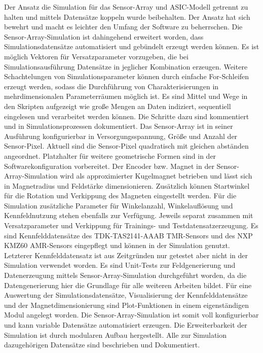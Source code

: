 \newline
Der Ansatz die Simulation für das Sensor-Array und ASIC-Modell getrennt zu halten und mittels Datensätze koppeln wurde beibehalten. Der Ansatz hat sich bewehrt und macht es leichter den Umfang der Software zu beherrschen. Die Sensor-Array-Simulation ist dahingehend erweitert worden, dass Simulationsdatensätze automatisiert und gebündelt erzeugt werden können. Es ist möglich Vektoren für Versatzparameter vorzugeben, die bei Simulationsausführung Datensätze in jeglicher Kombination erzeugen. Weitere Schachtelungen von Simulationsparameter können durch einfache For-Schleifen erzeugt werden, sodass die Durchführung von Charakterisierungen in mehrdimensionalen Parameterräumen möglich ist. Es sind Mittel und Wege in den Skripten aufgezeigt wie große Mengen an Daten indiziert, sequentiell eingelesen und verarbeitet werden können. Die Schritte dazu sind kommentiert und in Simulationsprozessen dokumentiert. Das Sensor-Array ist in seiner Ausführung konfigurierbar in Versorgungsspannung, Größe und Anzahl der Sensor-Pixel. Aktuell sind die Sensor-Pixel quadratisch mit gleichen abständen angeordnet. Platzhalter für weitere geometrische Formen sind in der Softwarekonfiguration vorbereitet. Der Encoder bzw. Magnet in der Sensor-Array-Simulation wird als approximierter Kugelmagnet betrieben und lässt sich in Magnetradius und Feldstärke dimensionieren. Zusätzlich können Startwinkel für die Rotation und Verkippung des Magneten eingestellt werden. Für die Simulation zusätzliche Parameter für Winkelanzahl, Winkelauflösung und Kennfeldnutzung stehen ebenfalls zur Verfügung. Jeweils separat zusammen mit Versatzparameter und Verkippung für Trainings- und Testdatensatzerzeugung. Es sind Kennfelddatensätze des TDK-TAS2141-AAAB TMR-Sensors und des NXP KMZ60 AMR-Sensors eingepflegt und können in der Simulation genutzt. Letzterer Kennfelddatensatz ist aus Zeitgründen nur getestet aber nicht in der Simulation verwendet worden. Es sind Unit-Tests zur Feldgenerierung und Datenerzeugung mittels Sensor-Array-Simulation durchgeführt worden, da die Datengenerierung hier die Grundlage für alle weiteren Arbeiten bildet. Für eine Auswertung der Simulationsdatensätze, Visualisierung der Kennfelddatensätze und der Magnetdimensionierung sind Plot-Funktionen in einem eigenständigen Modul angelegt worden. Die Sensor-Array-Simulation ist somit voll konfigurierbar und kann variable Datensätze automatisiert erzeugen. Die Erweiterbarkeit der Simulation ist durch modularen Aufbau hergestellt. Alle zur Simulation dazugehörigen Datensätze sind beschrieben und Dokumentiert.

